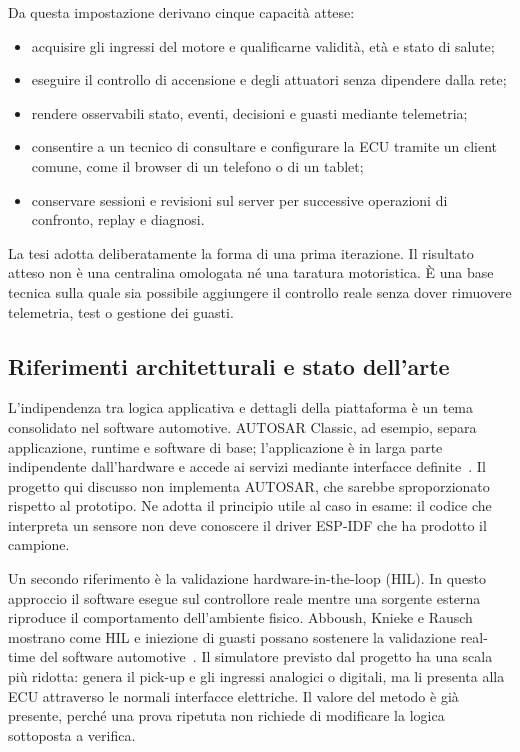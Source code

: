 \documentclass{article}
\begin{document}
Da questa impostazione derivano cinque capacità attese:

\begin{itemize}
    \item acquisire gli ingressi del motore e qualificarne validità, età e stato
          di salute;
    \item eseguire il controllo di accensione e degli attuatori senza dipendere
          dalla rete;
    \item rendere osservabili stato, eventi, decisioni e guasti mediante
          telemetria;
    \item consentire a un tecnico di consultare e configurare la ECU tramite un
          client comune, come il browser di un telefono o di un tablet;
    \item conservare sessioni e revisioni sul server per successive operazioni
          di confronto, replay e diagnosi.
\end{itemize}

La tesi adotta deliberatamente la forma di una prima iterazione. Il risultato
atteso non è una centralina omologata né una taratura motoristica. È una base
tecnica sulla quale sia possibile aggiungere il controllo reale senza dover
rimuovere telemetria, test o gestione dei guasti.

\subsection{Riferimenti architetturali e stato dell'arte}

L'indipendenza tra logica applicativa e dettagli della piattaforma è un tema
consolidato nel software automotive. AUTOSAR Classic, ad esempio, separa
applicazione, runtime e software di base; l'applicazione è in larga parte
indipendente dall'hardware e accede ai servizi mediante interfacce
definite~\cite{autosar_classic}. Il progetto qui discusso non implementa AUTOSAR, che
sarebbe sproporzionato rispetto al prototipo. Ne adotta il principio utile al
caso in esame: il codice che interpreta un sensore non deve conoscere il driver
ESP-IDF che ha prodotto il campione.

Un secondo riferimento è la validazione hardware-in-the-loop (HIL). In questo
approccio il software esegue sul controllore reale mentre una sorgente esterna
riproduce il comportamento dell'ambiente fisico. Abboush, Knieke e Rausch
mostrano come HIL e iniezione di guasti possano sostenere la validazione real-time
del software automotive~\cite{abboush_hil}. Il simulatore previsto dal progetto
ha una scala più ridotta: genera il pick-up e gli ingressi analogici o digitali,
ma li presenta alla ECU attraverso le normali interfacce elettriche. Il valore
del metodo è già presente, perché una prova ripetuta non richiede di modificare
la logica sottoposta a verifica.
\end{document}

